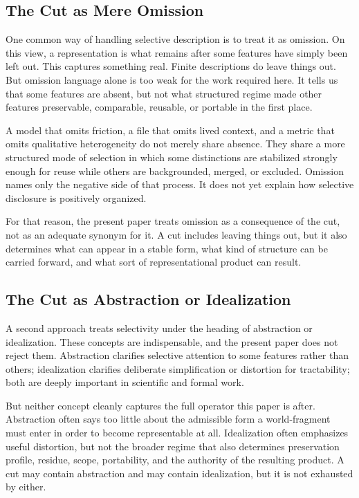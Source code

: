 \documentclass[11pt]{article}
\begin{document}
\subsection{The Cut as Mere Omission}

One common way of handling selective description is to treat it as omission. On this view, a representation is what remains after some features have simply been left out. This captures something real. Finite descriptions do leave things out. But omission language alone is too weak for the work required here. It tells us that some features are absent, but not what structured regime made other features preservable, comparable, reusable, or portable in the first place.

A model that omits friction, a file that omits lived context, and a metric that omits qualitative heterogeneity do not merely share absence. They share a more structured mode of selection in which some distinctions are stabilized strongly enough for reuse while others are backgrounded, merged, or excluded. Omission names only the negative side of that process. It does not yet explain how selective disclosure is positively organized.

For that reason, the present paper treats omission as a consequence of the cut, not as an adequate synonym for it. A cut includes leaving things out, but it also determines what can appear in a stable form, what kind of structure can be carried forward, and what sort of representational product can result.

\subsection{The Cut as Abstraction or Idealization}

A second approach treats selectivity under the heading of abstraction or idealization. These concepts are indispensable, and the present paper does not reject them. Abstraction clarifies selective attention to some features rather than others; idealization clarifies deliberate simplification or distortion for tractability; both are deeply important in scientific and formal work. \cite{frigg_hartmann_models_sep,frigg_nguyen_scientific_representation_sep}

But neither concept cleanly captures the full operator this paper is after. Abstraction often says too little about the admissible form a world-fragment must enter in order to become representable at all. Idealization often emphasizes useful distortion, but not the broader regime that also determines preservation profile, residue, scope, portability, and the authority of the resulting product. A cut may contain abstraction and may contain idealization, but it is not exhausted by either.
\end{document}
